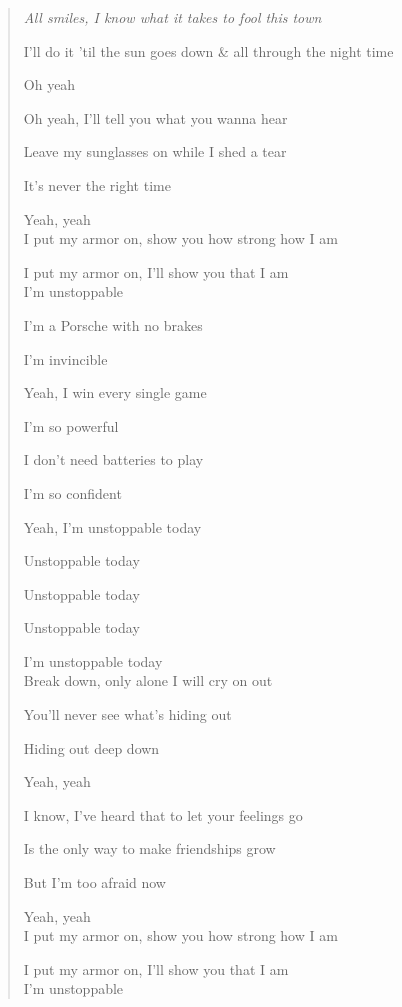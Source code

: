 \documentclass{article}
\begin{document}
\begin{enumerate}
	\begin{quotation}\it
		All smiles, I know what it takes to fool this town
		
		I'll do it 'til the sun goes down \& all through the night time
		
		Oh yeah
		
		Oh yeah, I'll tell you what you wanna hear
		
		Leave my sunglasses on while I shed a tear
		
		It's never the right time
		
		Yeah, yeah
		\\
		
		I put my armor on, show you how strong how I am
		
		I put my armor on, I'll show you that I am
		\\
		
		I'm unstoppable
		
		I'm a Porsche with no brakes
		
		I'm invincible
		
		Yeah, I win every single game
		
		I'm so powerful
		
		I don't need batteries to play
		
		I'm so confident
		
		Yeah, I'm unstoppable today
		
		Unstoppable today
		
		Unstoppable today
		
		Unstoppable today
		
		I'm unstoppable today
		\\
		
		Break down, only alone I will cry on out
		
		You'll never see what's hiding out
		
		Hiding out deep down
		
		Yeah, yeah
		
		I know, I've heard that to let your feelings go
		
		Is the only way to make friendships grow
		
		But I'm too afraid now
		
		Yeah, yeah
		\\
		
		I put my armor on, show you how strong how I am
		
		I put my armor on, I'll show you that I am
		\\
		
		I'm unstoppable
		

\end{quotation}
\end{enumerate}
\end{document}
